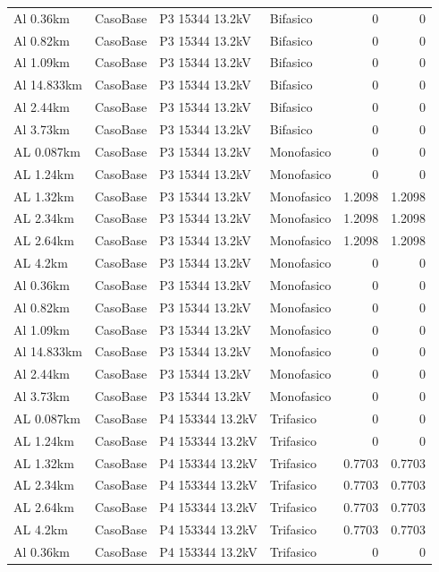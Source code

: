 \documentclass[11pt,a4paper]{article}
\begin{document}
\begin{longtable}{llllrr}
Al 0.36km & CasoBase & P3 15344 13.2kV & Bifasico & 0 & 0 \\
Al 0.82km & CasoBase & P3 15344 13.2kV & Bifasico & 0 & 0 \\
Al 1.09km & CasoBase & P3 15344 13.2kV & Bifasico & 0 & 0 \\
Al 14.833km & CasoBase & P3 15344 13.2kV & Bifasico & 0 & 0 \\
Al 2.44km & CasoBase & P3 15344 13.2kV & Bifasico & 0 & 0 \\
Al 3.73km & CasoBase & P3 15344 13.2kV & Bifasico & 0 & 0 \\
AL 0.087km & CasoBase & P3 15344 13.2kV & Monofasico & 0 & 0 \\
AL 1.24km & CasoBase & P3 15344 13.2kV & Monofasico & 0 & 0 \\
AL 1.32km & CasoBase & P3 15344 13.2kV & Monofasico & 1.2098 & 1.2098 \\
AL 2.34km & CasoBase & P3 15344 13.2kV & Monofasico & 1.2098 & 1.2098 \\
AL 2.64km & CasoBase & P3 15344 13.2kV & Monofasico & 1.2098 & 1.2098 \\
AL 4.2km & CasoBase & P3 15344 13.2kV & Monofasico & 0 & 0 \\
Al 0.36km & CasoBase & P3 15344 13.2kV & Monofasico & 0 & 0 \\
Al 0.82km & CasoBase & P3 15344 13.2kV & Monofasico & 0 & 0 \\
Al 1.09km & CasoBase & P3 15344 13.2kV & Monofasico & 0 & 0 \\
Al 14.833km & CasoBase & P3 15344 13.2kV & Monofasico & 0 & 0 \\
Al 2.44km & CasoBase & P3 15344 13.2kV & Monofasico & 0 & 0 \\
Al 3.73km & CasoBase & P3 15344 13.2kV & Monofasico & 0 & 0 \\
AL 0.087km & CasoBase & P4 153344 13.2kV & Trifasico & 0 & 0 \\
AL 1.24km & CasoBase & P4 153344 13.2kV & Trifasico & 0 & 0 \\
AL 1.32km & CasoBase & P4 153344 13.2kV & Trifasico & 0.7703 & 0.7703 \\
AL 2.34km & CasoBase & P4 153344 13.2kV & Trifasico & 0.7703 & 0.7703 \\
AL 2.64km & CasoBase & P4 153344 13.2kV & Trifasico & 0.7703 & 0.7703 \\
AL 4.2km & CasoBase & P4 153344 13.2kV & Trifasico & 0.7703 & 0.7703 \\
Al 0.36km & CasoBase & P4 153344 13.2kV & Trifasico & 0 & 0 \\

\end{longtable}
\end{document}
